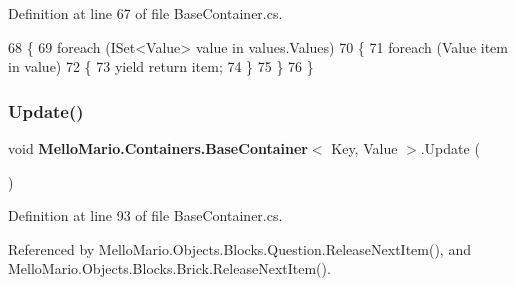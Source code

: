 Definition at line 67 of file Base\+Container.\+cs.


\begin{DoxyCode}
68         \{
69             \textcolor{keywordflow}{foreach} (ISet<Value> value \textcolor{keywordflow}{in} values.Values)
70             \{
71                 \textcolor{keywordflow}{foreach} (Value item \textcolor{keywordflow}{in} value)
72                 \{
73                     yield \textcolor{keywordflow}{return} item;
74                 \}
75             \}
76         \}
\end{DoxyCode}
\mbox{\label{classMelloMario_1_1Containers_1_1BaseContainer_af04d91bc235e61367a9226814b8966e3}} 
\subsubsection{Update()}
{\footnotesize\ttfamily void \textbf{ Mello\+Mario.\+Containers.\+Base\+Container}$<$ Key, Value $>$.Update (\begin{DoxyParamCaption}{ }\end{DoxyParamCaption})}



Definition at line 93 of file Base\+Container.\+cs.



Referenced by Mello\+Mario.\+Objects.\+Blocks.\+Question.\+Release\+Next\+Item(), and Mello\+Mario.\+Objects.\+Blocks.\+Brick.\+Release\+Next\+Item().


